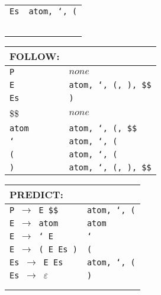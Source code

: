 \documentclass{article}
\begin{document}
\begin{enumerate}
\begin{tabular}{l l}
        \texttt{Es} &     \texttt{atom, `, (} \\
        & \\
        & \\
        & \\
        & \\
        & \\
    \end{tabular}
    \begin{tabular}{l l}
        FOLLOW: & \\
        \hline
        \texttt{P}   &    $none$ \\
        \texttt{E}   &    \texttt{atom, `, (, ), \$\$} \\
        \texttt{Es}  &    \texttt{)} \\
        \$\$ & $none$ \\
        \texttt{atom} & \texttt{atom, `, (, \$\$} \\
        \texttt{`} & \texttt{atom, `, (} \\
        \texttt{(} & \texttt{atom, `, (} \\
        \texttt{)} & \texttt{atom, `, (, ), \$\$} \\
    \end{tabular}
    \begin{tabular}{l l}
        PREDICT: & \\
        \hline
        \texttt{P $\to$ E \$\$}  &              \texttt{atom, `, (} \\
        \texttt{E $\to$ atom}   &             \texttt{atom} \\
        \texttt{E $\to$ ` E}     &    \texttt{`} \\
        \texttt{E $\to$ ( E Es )} &   \texttt{(} \\
        \texttt{Es $\to$ E Es}    &   \texttt{atom, `, (} \\
        \texttt{Es $\to$ $\varepsilon$}       &   \texttt{)} \\
        & \\
        & \\
    \end{tabular}
\end{enumerate}
\end{document}
